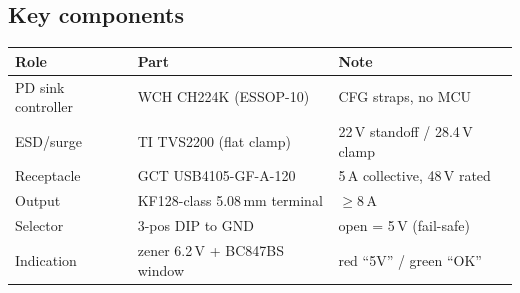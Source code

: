 \documentclass[11pt,a4paper]{article}
\begin{document}
\subsection{Key components}
\begin{tabular}{@{}lll@{}}
\toprule
Role & Part & Note\\
\midrule
PD sink controller & WCH CH224K (ESSOP-10) & CFG straps, no MCU\\
ESD/surge & TI TVS2200 (flat clamp) & 22\,V standoff / 28.4\,V clamp\\
Receptacle & GCT USB4105-GF-A-120 & 5\,A collective, 48\,V rated\\
Output & KF128-class 5.08\,mm terminal & $\geq$8\,A\\
Selector & 3-pos DIP to GND & open = 5\,V (fail-safe)\\
Indication & zener 6.2\,V + BC847BS window & red ``5V'' / green ``OK''\\
\bottomrule
\end{tabular}
\end{document}
